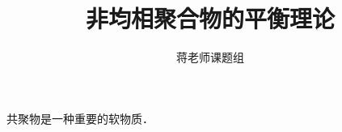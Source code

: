\documentclass[12pt,a4paper]{article}
\title{非均相聚合物的平衡理论}
\author{蒋老师课题组}
\date{\chntoday}
\begin{document}
\maketitle

共聚物是一种重要的软物质．


\cite{tam19912d}

\end{document}
